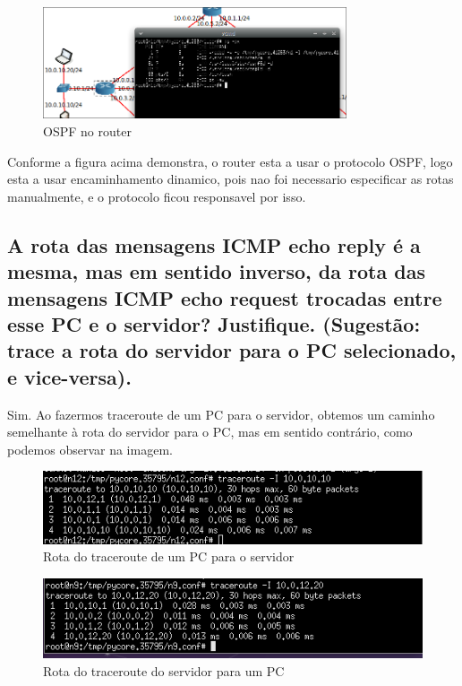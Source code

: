 \documentclass{article}
\begin{document}
\begin{figure}[h]
    \centering
    \includegraphics[width=0.8\textwidth]{images/ospf.png}
    \caption{\label{fig:ospf}OSPF no router}
\end{figure}

Conforme a figura acima demonstra, o router esta a usar o protocolo OSPF, logo esta a usar encaminhamento dinamico, pois nao foi necessario especificar as rotas manualmente, e o protocolo ficou responsavel por isso.

\subsection{A rota das mensagens ICMP echo reply é a mesma, mas em
sentido inverso, da rota das mensagens ICMP echo request
trocadas entre esse PC e o servidor? Justifique. (Sugestão: trace a
rota do servidor para o PC selecionado, e vice-versa).}

Sim. Ao fazermos traceroute de um PC para o servidor, obtemos um caminho semelhante à rota do servidor para o PC, mas em sentido contrário, como podemos observar na imagem.

\begin{figure}[h]
    \centering
    \includegraphics[width=1\textwidth]{images/pctoserver.png}
    \caption{\label{fig:pacote}Rota do traceroute de um PC para o servidor}
\end{figure}

\begin{figure}[h]
    \centering
    \includegraphics[width=1\textwidth]{images/servertopc.png}
    \caption{\label{fig:pacote}Rota do traceroute do servidor para um PC}
\end{figure}
\end{document}
